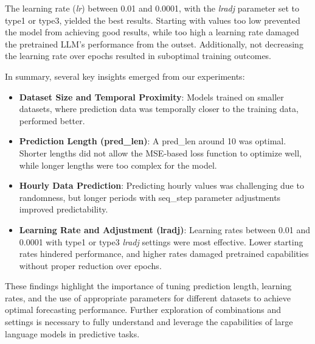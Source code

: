 The learning rate (\textit{lr}) between 0.01 and 0.0001, with the \textit{lradj} parameter set to type1 or type3, yielded the best results. Starting with values too low prevented the model from achieving good results, while too high a learning rate damaged the pretrained LLM’s performance from the outset. Additionally, not decreasing the learning rate over epochs resulted in suboptimal training outcomes.

In summary, several key insights emerged from our experiments:

\begin{itemize}
	\item \textbf{Dataset Size and Temporal Proximity}: Models trained on smaller datasets, where prediction data was temporally closer to the training data, performed better.
	\item \textbf{Prediction Length (pred\_len)}: A pred\_len around 10 was optimal. Shorter lengths did not allow the MSE-based loss function to optimize well, while longer lengths were too complex for the model.
	\item \textbf{Hourly Data Prediction}: Predicting hourly values was challenging due to randomness, but longer periods with seq\_step parameter adjustments improved predictability.
	\item \textbf{Learning Rate and Adjustment (lradj)}: Learning rates between 0.01 and 0.0001 with type1 or type3 \textit{lradj} settings were most effective. Lower starting rates hindered performance, and higher rates damaged pretrained capabilities without proper reduction over epochs.
\end{itemize}

These findings highlight the importance of tuning prediction length, learning rates, and the use of appropriate parameters for different datasets to achieve optimal forecasting performance. Further exploration of combinations and settings is necessary to fully understand and leverage the capabilities of large language models in predictive tasks.

